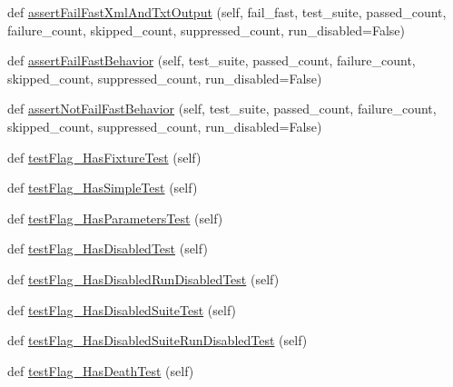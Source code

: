 \begin{DoxyCompactItemize}
def \mbox{\hyperlink{classgoogletest-failfast-unittest_1_1GTestFailFastUnitTest_a752c45c96a6daa7efc47edb1f494b400}{assert\+Fail\+Fast\+Xml\+And\+Txt\+Output}} (self, fail\+\_\+fast, test\+\_\+suite, passed\+\_\+count, failure\+\_\+count, skipped\+\_\+count, suppressed\+\_\+count, run\+\_\+disabled=False)
\item 
def \mbox{\hyperlink{classgoogletest-failfast-unittest_1_1GTestFailFastUnitTest_ad0305a6ba4982f90ec3ddedf2a81369f}{assert\+Fail\+Fast\+Behavior}} (self, test\+\_\+suite, passed\+\_\+count, failure\+\_\+count, skipped\+\_\+count, suppressed\+\_\+count, run\+\_\+disabled=False)
\item 
def \mbox{\hyperlink{classgoogletest-failfast-unittest_1_1GTestFailFastUnitTest_a7c2f4c49ee6ff969b7373a3cec08ffe2}{assert\+Not\+Fail\+Fast\+Behavior}} (self, test\+\_\+suite, passed\+\_\+count, failure\+\_\+count, skipped\+\_\+count, suppressed\+\_\+count, run\+\_\+disabled=False)
\item 
def \mbox{\hyperlink{classgoogletest-failfast-unittest_1_1GTestFailFastUnitTest_af95aac2efeb297b78be0a3d28f3b3285}{test\+Flag\+\_\+\+Has\+Fixture\+Test}} (self)
\item 
def \mbox{\hyperlink{classgoogletest-failfast-unittest_1_1GTestFailFastUnitTest_a0912f4b1d91586ef5e4d73b0e915c40e}{test\+Flag\+\_\+\+Has\+Simple\+Test}} (self)
\item 
def \mbox{\hyperlink{classgoogletest-failfast-unittest_1_1GTestFailFastUnitTest_abbfff1ef73c601860f46361dae18d65a}{test\+Flag\+\_\+\+Has\+Parameters\+Test}} (self)
\item 
def \mbox{\hyperlink{classgoogletest-failfast-unittest_1_1GTestFailFastUnitTest_a879f6fdc7c5c1bed898e59e44c9e4ac8}{test\+Flag\+\_\+\+Has\+Disabled\+Test}} (self)
\item 
def \mbox{\hyperlink{classgoogletest-failfast-unittest_1_1GTestFailFastUnitTest_a740cee36272084c7948b1ebf64f652ae}{test\+Flag\+\_\+\+Has\+Disabled\+Run\+Disabled\+Test}} (self)
\item 
def \mbox{\hyperlink{classgoogletest-failfast-unittest_1_1GTestFailFastUnitTest_aad063354b4cf7fd600d3dfeef4c6653a}{test\+Flag\+\_\+\+Has\+Disabled\+Suite\+Test}} (self)
\item 
def \mbox{\hyperlink{classgoogletest-failfast-unittest_1_1GTestFailFastUnitTest_ab2194792adbb0121f66506be70b71698}{test\+Flag\+\_\+\+Has\+Disabled\+Suite\+Run\+Disabled\+Test}} (self)
\item 
def \mbox{\hyperlink{classgoogletest-failfast-unittest_1_1GTestFailFastUnitTest_aaece76802795e2116b8af727b70e14e9}{test\+Flag\+\_\+\+Has\+Death\+Test}} (self)
\end{DoxyCompactItemize}


